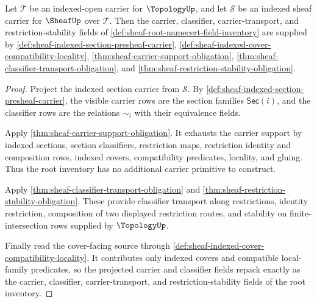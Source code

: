 \begin{theorem}
\label{thm:sheaf-root-namecert-carrier-classifier-fields}
Let $\mathcal{T}$ be an indexed-open carrier for $\TopologyUp$, and let $\mathcal{S}$ be an indexed sheaf carrier for $\SheafUp$ over $\mathcal{T}$. Then the carrier, classifier, carrier-transport, and restriction-stability fields of \autoref{def:sheaf-root-namecert-field-inventory} are supplied by \autoref{def:sheaf-indexed-section-presheaf-carrier}, \autoref{def:sheaf-indexed-cover-compatibility-locality}, \autoref{thm:sheaf-carrier-support-obligation}, \autoref{thm:sheaf-classifier-transport-obligation}, and \autoref{thm:sheaf-restriction-stability-obligation}.
\end{theorem}
\begin{proof}
Project the indexed section carrier from $\mathcal{S}$. By \autoref{def:sheaf-indexed-section-presheaf-carrier}, the visible carrier rows are the section families $\mathsf{Sec}(i)$, and the classifier rows are the relations $\sim_i$ with their equivalence fields.

Apply \autoref{thm:sheaf-carrier-support-obligation}. It exhausts the carrier support by indexed sections, section classifiers, restriction maps, restriction identity and composition rows, indexed covers, compatibility predicates, locality, and gluing. Thus the root inventory has no additional carrier primitive to construct.

Apply \autoref{thm:sheaf-classifier-transport-obligation} and \autoref{thm:sheaf-restriction-stability-obligation}. These provide classifier transport along restrictions, identity restriction, composition of two displayed restriction routes, and stability on finite-intersection rows supplied by $\TopologyUp$.

Finally read the cover-facing source through \autoref{def:sheaf-indexed-cover-compatibility-locality}. It contributes only indexed covers and compatible local-family predicates, so the projected carrier and classifier fields repack exactly as the carrier, classifier, carrier-transport, and restriction-stability fields of the root inventory.
\end{proof}

